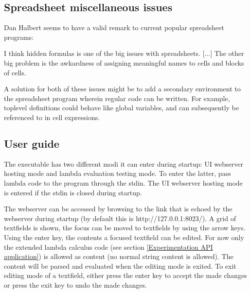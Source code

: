 \documentclass[10pt,a4paper]{article}
\begin{document}
\subsection{Spreadsheet miscellaneous issues}
\label{Spreadsheet miscellaneous issues}
Dan Halbert seems to have a valid remark to current popular spreadsheet programs:
\begin{displayquote}[Halbert, 2012]
I think hidden formulas is one of the big issues with spreadsheets. [...] The other big problem
is the awkardness of assigning meaningful names to cells and blocks of cells.
\end{displayquote}
A solution for both of these issues might be to add a secondary environment to the spreadsheet program
wherein regular code can be written. For example, toplevel definitions could behave like global
variables, and can subsequently be referenced to in cell expressions.

\subsection{User guide}
The executable has two different modi it can enter during startup: UI webserver hosting mode and lambda
evaluation testing mode. To enter the latter, pass lambda code to the program through the stdin.
The UI webserver hosting mode is entered if the stdin is closed during startup.

The webserver can be accessed by browsing to the link that is echoed by the webserver during startup
(by default this is http://127.0.0.1:8023/). A grid of textfields is shown, the focus can be moved
to textfields by using the arrow keys. Using the enter key, the contents a focused textfield can be edited.
For now only the extended lambda calculus code (see section \ref{Experimentation API application})
is allowed as content (no normal string content is allowed). The content will be parsed and evaluated
when the editing mode is exited.
To exit editing mode of a textfield, either press the enter key to accept the made changes or
press the exit key to undo the made changes.
\end{document}
